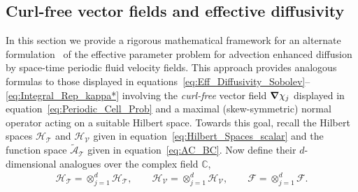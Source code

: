 \documentclass[leqno,onefignum,onetabnum]{siamltex1213}
\newcommand{\Tc}{\mathcal{T}}
\newcommand{\Vc}{\mathcal{V}}
\newcommand{\Hc}{\mathcal{H}}
\newcommand{\Fc}{\mathcal{F}}
\newcommand{\Hs}{\mathscr{H}}
\newcommand{\As}{\mathscr{A}}
\newcommand{\Fs}{\mathscr{F}}
\newcommand\bnabla{\mbox{\boldmath${\nabla}$}}
\begin{document}
\subsection{Curl-free vector fields and effective diffusivity}
\label{sec:Curl_Free_Fields}
%
In this section we provide a rigorous mathematical framework for an
alternate formulation~\cite{Avellaneda:PRE:3249} of the effective
parameter problem for advection enhanced diffusion by space-time
periodic fluid velocity fields.  This approach provides analogous
formulas to those displayed in
equations~\eqref{eq:Eff_Diffusivity_Sobolev}--\eqref{eq:Integral_Rep_kappa*}
involving the \emph{curl-free} vector field $\bnabla\chi_j$ displayed in
equation~\eqref{eq:Periodic_Cell_Prob} and a maximal (skew-symmetric)
normal operator acting on a suitable Hilbert space. Towards this goal,
recall the Hilbert spaces $\Hs_{\Tc}$ and $\Hs_{\Vc}$ given in
equation~\eqref{eq:Hilbert_Spaces_scalar} and the function space
$\tilde{\As}_{\Tc}$ given in equation~\eqref{eq:AC_BC}. Now define
their $d$-dimensional analogues over the complex field $\mathbb{C}$,  
%
\begin{align}\label{eq:Hilbert_Spaces_vector}
  \Hc_{\Tc}=\otimes_{j=1}^d\Hs_{\Tc}, \qquad
  \Hc_{\Vc}=\otimes_{j=1}^d\Hs_{\Vc}, \qquad
  \Fc=\otimes_{j=1}^d\Fs.
\end{align}
%
\end{document}
